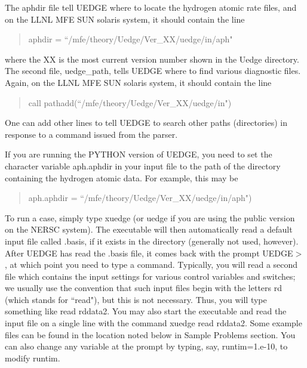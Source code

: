 \documentclass [12pt]{article}
\begin{document}
The {\sf aphdir} file tell {\sf UEDGE} where to locate the hydrogen atomic
rate files, and on the LLNL MFE SUN solaris system, it should contain the line

\begin{verse} \sf
aphdir = ``/mfe/theory/Uedge/Ver\_XX/uedge/in/aph"
\end{verse}
where the {\sf XX} is the most current version number shown in the Uedge
directory.  The second file, {\sf uedge\_path}, tells {\sf UEDGE} where to
find various diagnostic files.  Again, on the LLNL MFE SUN solaris system, it
should contain the line

\begin{verse} \sf
call pathadd(``/mfe/theory/Uedge/Ver\_XX/uedge/in")
\end{verse}
%
One can add other lines to tell {\sf UEDGE} to search other paths (directories)
in response to a command issued from the parser.

If you are running the {\sf PYTHON} version of {\sf UEDGE}, you need to set
the character variable {\sf aph.aphdir} in your input file to the path of the
directory containing the hydrogen atomic data.  For example, this may be

\begin{verse} \sf
aph.aphdir = ``/mfe/theory/Uedge/Ver\_XX/uedge/in/aph")
\end{verse}

To run a case, simply type {\sf xuedge} (or {\sf uedge} if you are using the
public version on the NERSC system).  The executable will then automatically
read a default input file called {\sf .basis}, if it exists in the directory
(generally not used, however).  After {\sf UEDGE} has read the {\sf .basis}
file, it comes back with the prompt {\sf UEDGE$>$}, at which point you need to
type a command.  Typically, you will read a second file which contains the
input settings for various control variables and switches; we usually use the
convention that such input files begin with the letters rd (which stands for
``read"), but this is not necessary.  Thus, you will type something like {\sf
  read rddata2}. You may also start the executable and read the input file on
a single line with the command {\sf xuedge read rddata2}.  Some example files
can be found in the location noted below in Sample Problems section. You can
also change any variable at the prompt by typing, say, runtim=1.e-10, to
modify runtim.
\end{document}

